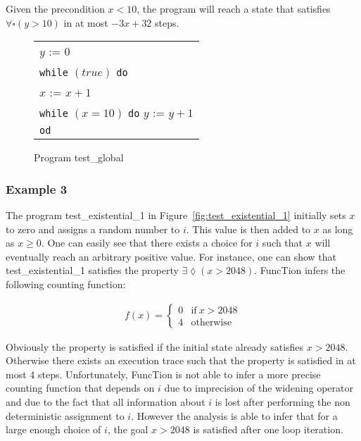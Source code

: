 \documentclass[11pt,a4paper,titlepage]{article}
\theoremstyle{definition}
\begin{document}
Given the precondition $x < 10$, the program will reach a state that satisfies $\forall\square(y > 10)$ in at most
$-3x + 32$ steps.

\begin{figure}
    \begin{center}
        \begin{tabular}{l}
            $y$ := $0$ \\
            \texttt{while} $(true)$ \texttt{do} \\
            \hspace{1em}$x$ := $x + 1$ \\
            \hspace{1em}\texttt{while} $(x = 10)$ \texttt{do} $y$ := $y + 1$ \\
            \texttt{od}
        \end{tabular}
    \end{center}
    \vspace{-1em}
    \caption{Program \textsf{test\_global}}
    \label{fig:test_global}
\end{figure}


\subsubsection*{Example 3}
The program \textsf{test\_existential\_1} in Figure~\ref{fig:test_existential_1} initially sets $x$ to zero and assigns a random number to $i$.
This value is then added to $x$ as long as $x \geq 0$. One can easily see that there exists 
a choice for $i$ such that $x$ will eventually reach an arbitrary positive value. 
For instance, one can show that \textsf{test\_existential\_1}
satisfies the property $\exists\lozenge(x > 2048)$. 
FuncTion infers the following counting function:

\begin{align*}
f(x) = \begin{cases}
    0  & \text{if} \ x > 2048 \\
    4  & \text{otherwise}
\end{cases}
\end{align*}

Obviously the property is satisfied if the initial state already satisfies $x > 2048$. Otherwise there exists an execution trace
such that the property is satisfied in at most 4 steps. Unfortunately, FuncTion is not able to infer a more precise 
counting function that depends on $i$ due to imprecision of the widening operator 
and due to the fact that all information about $i$ is lost after performing the non deterministic assignment to $i$. 
However the analysis is able to infer that for a large enough choice of $i$, the goal $x > 2048$ is satisfied after one loop iteration.
\end{document}
